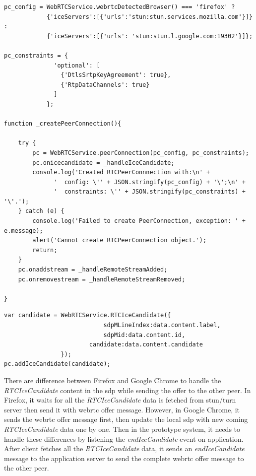 \begin{lstlisting}[caption={Create Peer Connection function},label={code:create_peer_connection}]
pc_config = WebRTCService.webrtcDetectedBrowser() === 'firefox' ?
  			{'iceServers':[{'urls':'stun:stun.services.mozilla.com'}]} :
  			{'iceServers':[{'urls': 'stun:stun.l.google.com:19302'}]};

pc_constraints = {
			  'optional': [
			    {'DtlsSrtpKeyAgreement': true},
			    {'RtpDataChannels': true}
			  ]
			};
			
function _createPeerConnection(){

	try {
		pc = WebRTCService.peerConnection(pc_config, pc_constraints);
		pc.onicecandidate = _handleIceCandidate;
		console.log('Created RTCPeerConnnection with:\n' +
		      '  config: \'' + JSON.stringify(pc_config) + '\';\n' +
		      '  constraints: \'' + JSON.stringify(pc_constraints) + '\'.');
	} catch (e) {
		console.log('Failed to create PeerConnection, exception: ' + e.message);
		alert('Cannot create RTCPeerConnection object.');
		return;
	}
	pc.onaddstream = _handleRemoteStreamAdded;
	pc.onremovestream = _handleRemoteStreamRemoved;

}
\end{lstlisting}

\begin{lstlisting}[caption={Add Remote IceCandidate function},label={code:add_remote_ice}]
var candidate = WebRTCService.RTCIceCandidate({
					    	sdpMLineIndex:data.content.label,
					    	sdpMid:data.content.id,
					    candidate:data.content.candidate
				});
pc.addIceCandidate(candidate);

\end{lstlisting}

\par There are difference between Firefox and Google Chrome to handle the \textit{RTCIceCandidate} content in the \gls{sdp} while sending the offer to the other peer. In Firefox, it waits for all the \textit{RTCIceCandidate} data is fetched from \gls{stun}/\gls{turn} server then send it with \gls{webrtc} offer message. However, in Google Chrome, it sends the \gls{webrtc} offer message first, then update the local \gls{sdp} with new coming \textit{RTCIceCandidate} data one by one. Then in the prototype system, it needs to handle these differences by listening the \textit{endIceCandidate} event on application. After client fetches all the \textit{RTCIceCandidate} data, it sends an \textit{endIceCandidate} message to the application server to send the complete \gls{webrtc} offer message to the other peer.

